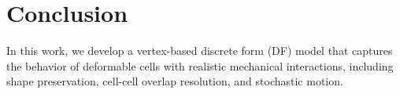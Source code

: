 \section{Conclusion}
In this work, we develop a vertex-based discrete form (DF) model that captures the behavior of deformable cells with realistic mechanical interactions, including shape preservation, cell-cell overlap resolution, and stochastic motion. 